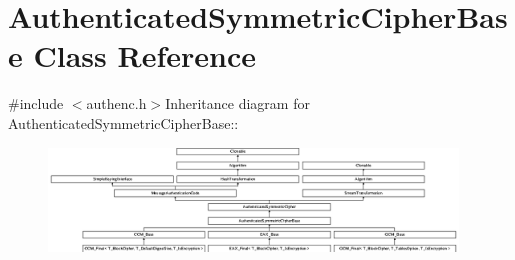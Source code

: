 \hypertarget{class_authenticated_symmetric_cipher_base}{
\section{AuthenticatedSymmetricCipherBase Class Reference}
\label{class_authenticated_symmetric_cipher_base}
}


 


{\ttfamily \#include $<$authenc.h$>$}Inheritance diagram for AuthenticatedSymmetricCipherBase::\begin{figure}[H]
\begin{center}
\leavevmode
\includegraphics[height=2.75862cm]{class_authenticated_symmetric_cipher_base}
\end{center}
\end{figure}
